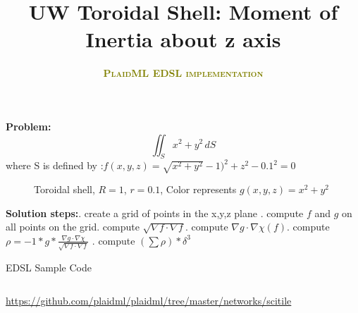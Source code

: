 \documentclass[9pt,twocolumn,twoside,notitlepage]{article}
\title{UW Toroidal Shell: Moment of Inertia about z axis }
\author[1,2,3]{\normalfont\sffamily\bfseries\scshape\fontsize{12}{14}\selectfont \textcolor{olive} {PlaidML EDSL implementation}}
\begin{document}


\textbf{Problem: } 
$$\iint_S  x^2 + y^2 \,dS$$
where S is defined by :\newline $f(x,y,z)=\sqrt{x^2+y^2}-1)^2+z^2 - 0.1^2=0$
 \begin{figure}[htbp]
 \centering
 \caption{Toroidal shell, $R= 1$, $r=0.1$, Color represents $g(x,y,z)=x^2+y^2$}
 \end{figure}

\textbf{Solution steps:}. create a grid of points in the x,y,z plane . compute $f$ and $g$ on all points on the grid. compute $\sqrt{\nabla f \cdot \nabla f}$. compute $\nabla g \cdot \nabla \chi (f)$. compute $\rho = -1 * g * \frac{\nabla g \cdot \nabla 
\chi}{\sqrt{\nabla f \cdot \nabla f}}$ . compute $(\sum \rho)*\delta^3$

\begin{algorithm}
\caption{EDSL Sample Code}\label{euclid}
\inputminted{python}{partial_diff.py}
\hyperlink{https://github.com/plaidml/plaidml/tree/master/networks/scitile}{https://github.com/plaidml/plaidml/tree/master/networks/scitile}
\end{algorithm}
\end{document}
